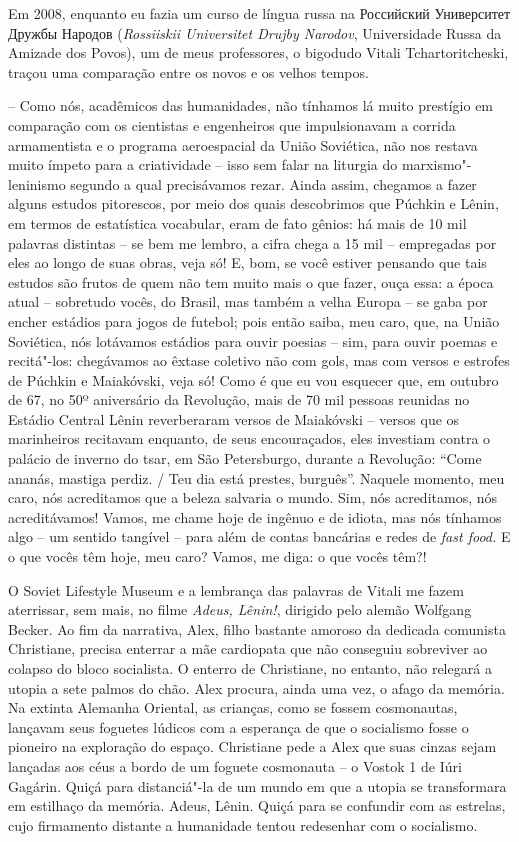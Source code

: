 Em 2008, enquanto eu fazia um curso de língua russa na Российский
Университет Дружбы Народов (\emph{Rossiiskii Universitet Drujby
Narodov}, Universidade Russa da Amizade dos Povos), um de meus
professores, o bigodudo Vitali Tchartoritcheski, traçou uma comparação
entre os novos e os velhos tempos.

-- Como nós, acadêmicos das humanidades, não tínhamos lá muito prestígio
em comparação com os cientistas e engenheiros que impulsionavam a
corrida armamentista e o programa aeroespacial da União Soviética, não
nos restava muito ímpeto para a criatividade -- isso sem falar na
liturgia do marxismo"-leninismo segundo a qual precisávamos rezar. Ainda
assim, chegamos a fazer alguns estudos pitorescos, por meio dos quais
descobrimos que Púchkin e Lênin, em termos de estatística vocabular,
eram de fato gênios: há mais de 10 mil palavras distintas -- se bem me
lembro, a cifra chega a 15 mil -- empregadas por eles ao longo de suas
obras, veja só! E, bom, se você estiver pensando que tais estudos são
frutos de quem não tem muito mais o que fazer, ouça essa: a época atual
-- sobretudo vocês, do Brasil, mas também a velha Europa -- se gaba por
encher estádios para jogos de futebol; pois então saiba, meu caro, que,
na União Soviética, nós lotávamos estádios para ouvir poesias -- sim,
para ouvir poemas e recitá"-los: chegávamos ao êxtase coletivo não com
gols, mas com versos e estrofes de Púchkin e Maiakóvski, veja só! Como é
que eu vou esquecer que, em outubro de 67, no 50º aniversário da
Revolução, mais de 70 mil pessoas reunidas no Estádio Central Lênin
reverberaram versos de Maiakóvski -- versos que os marinheiros recitavam
enquanto, de seus encouraçados, eles investiam contra o palácio de
inverno do tsar, em São Petersburgo, durante a Revolução: ``Come ananás,
mastiga perdiz. / Teu dia está prestes, burguês''. Naquele momento, meu
caro, nós acreditamos que a beleza salvaria o mundo. Sim, nós
acreditamos, nós acreditávamos! Vamos, me chame hoje de ingênuo e de
idiota, mas nós tínhamos algo -- um sentido tangível -- para além de
contas bancárias e redes de \emph{fast food.} E o que vocês têm hoje,
meu caro? Vamos, me diga: o que vocês têm?!

O Soviet Lifestyle Museum e a lembrança das palavras de Vitali me fazem
aterrissar, sem mais, no filme \emph{Adeus, Lênin!}, dirigido pelo
alemão Wolfgang Becker. Ao fim da narrativa, Alex, filho bastante
amoroso da dedicada comunista Christiane, precisa enterrar a mãe
cardiopata que não conseguiu sobreviver ao colapso do bloco socialista.
O enterro de Christiane, no entanto, não relegará a utopia a sete palmos
do chão. Alex procura, ainda uma vez, o afago da memória. Na extinta
Alemanha Oriental, as crianças, como se fossem cosmonautas, lançavam
seus foguetes lúdicos com a esperança de que o socialismo fosse o
pioneiro na exploração do espaço. Christiane pede a Alex que suas cinzas
sejam lançadas aos céus a bordo de um foguete cosmonauta -- o Vostok 1
de Iúri Gagárin. Quiçá para distanciá"-la de um mundo em que a utopia se
transformara em estilhaço da memória. Adeus, Lênin. Quiçá para se
confundir com as estrelas, cujo firmamento distante a humanidade tentou
redesenhar com o socialismo.

